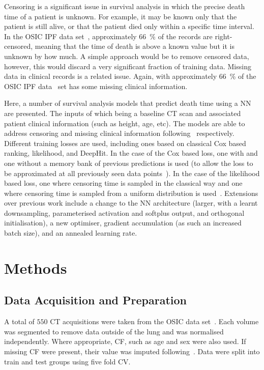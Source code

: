         Censoring is a significant issue in survival analysis in which the precise death time of a patient is unknown. For example, it may be known only that the patient is still alive, or that the patient died only within a specific time interval. In the \gls{OSIC} \gls{IPF} data set~\parencite{OSICOSICRepository}, approximately \SI{66}{\percent} of the records are right-censored, meaning that the time of death is above a known value but it is unknown by how much. A simple approach would be to remove censored data, however, this would discard a very significant fraction of training data. Missing data in clinical records is a related issue. Again, with approximately \SI{66}{\percent} of the \gls{OSIC} \gls{IPF} data~\parencite{OSICOSICRepository} set has some missing clinical information.
    
        Here, a number of survival analysis models that predict death time using a \gls{NN} are presented. The inputs of which being a baseline \gls{CT} scan and associated patient clinical information (such as height, age, etc). The models are able to address censoring and missing clinical information following~\parencite{Shahin2023DeepAnalysis, Shahin2022SurvivalData} respectively. Different training losses are used, including ones based on classical Cox based ranking, likelihood, and DeepHit. In the case of the Cox based loss, one with and one without a memory bank of previous predictions is used (to allow the loss to be approximated at all previously seen data points~\parencite{Shahin2022SurvivalData}). In the case of the likelihood based loss, one where censoring time is sampled in the classical way and one where censoring time is sampled from a uniform distribution is used~\parencite{Shahin2023DeepAnalysis}. Extensions over previous work include a change to the \gls{NN} architecture (larger, with a learnt downsampling, parameterised activation and softplus output, and orthogonal initialisation), a new optimiser, gradient accumulation (as such an increased batch size), and an annealed learning rate.
    \section{Methods}\label{sec:deep_learning_for_ct_based_survival_analysis_of_idiopathic_pulmonary_fibrosis_patients_appendix_methods}
        \subsection{Data Acquisition and Preparation} \label{sec:deep_learning_for_ct_based_survival_analysis_of_idiopathic_pulmonary_fibrosis_patients_appendix_data_acquisition_and_preparation}
            A total of $550$ \gls{CT} acquisitions were taken from the \gls{OSIC} data set~\parencite{OSICOSICRepository}. Each volume was segmented to remove data outside of the lung and was normalised independently. Where appropriate, \gls{CF}, such as age and sex were also used. If missing \gls{CF} were present, their value was imputed following~\parencite{Shahin2022SurvivalData}. Data were split into train and test groups using five fold \gls{CV}.

